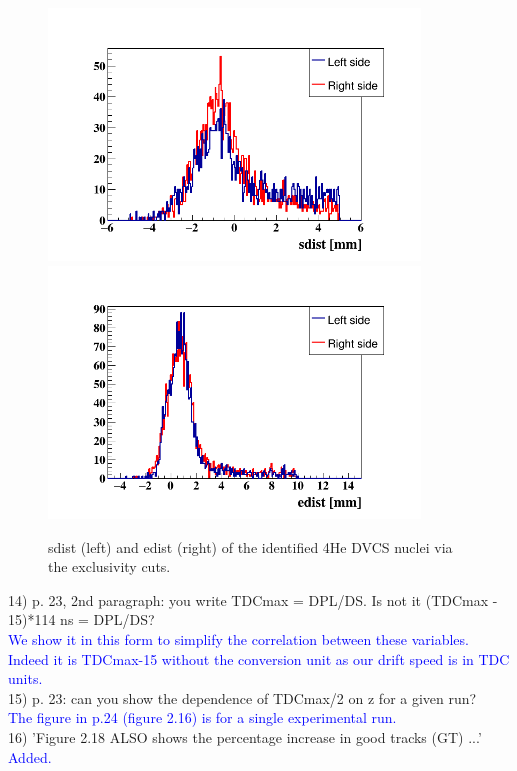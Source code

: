 \begin{figure}[tbp]
   \hspace{-1.0cm}
   \includegraphics[height=6.7cm]{fig/coh_rtpc_sdist.png}
\includegraphics[height=6.7cm]{fig/coh_rtpc_edist.png}
\caption{sdist (left) and edist (right) of the identified 4He DVCS nuclei via 
the exclusivity cuts.}
\label{fig:dvcs_coh_sdist_edist}
 \end{figure}


14) p. 23, 2nd paragraph: you write TDCmax = DPL/DS. Is not it 
(TDCmax - 15)*114 ns = DPL/DS?\\
\textcolor{blue}{ We show it in this form to simplify the correlation between 
these variables.  Indeed it is  TDCmax-15 without the conversion unit as our 
drift speed is in TDC units. } \\

15) p. 23: can you show the dependence of TDCmax/2 on z for a given run? \\ 
\textcolor{blue}{ The figure in p.24 (figure 2.16) is for a single 
experimental run.} \\

16) 'Figure 2.18 ALSO shows the percentage increase in good 
tracks (GT) ...' \\
\textcolor{blue}{ Added.}\\

